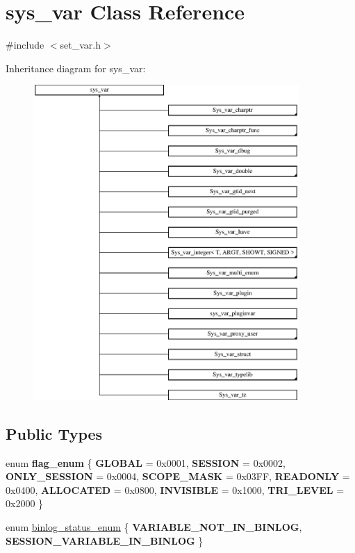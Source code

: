 \hypertarget{classsys__var}{}\section{sys\+\_\+var Class Reference}
\label{classsys__var}


{\ttfamily \#include $<$set\+\_\+var.\+h$>$}

Inheritance diagram for sys\+\_\+var\+:\begin{figure}[H]
\begin{center}
\leavevmode
\includegraphics[height=12.000000cm]{classsys__var}
\end{center}
\end{figure}
\subsection*{Public Types}
\begin{DoxyCompactItemize}
\item 
\mbox{\label{classsys__var_a3ffb3adc1beedff5322c9d39b53cd22a}} 
enum {\bfseries flag\+\_\+enum} \{ \newline
{\bfseries G\+L\+O\+B\+AL} = 0x0001, 
{\bfseries S\+E\+S\+S\+I\+ON} = 0x0002, 
{\bfseries O\+N\+L\+Y\+\_\+\+S\+E\+S\+S\+I\+ON} = 0x0004, 
{\bfseries S\+C\+O\+P\+E\+\_\+\+M\+A\+SK} = 0x03FF, 
\newline
{\bfseries R\+E\+A\+D\+O\+N\+LY} = 0x0400, 
{\bfseries A\+L\+L\+O\+C\+A\+T\+ED} = 0x0800, 
{\bfseries I\+N\+V\+I\+S\+I\+B\+LE} = 0x1000, 
{\bfseries T\+R\+I\+\_\+\+L\+E\+V\+EL} = 0x2000
 \}
\item 
enum \mbox{\hyperlink{classsys__var_a664520ec82191888717c86085bfa83ce}{binlog\+\_\+status\+\_\+enum}} \{ {\bfseries V\+A\+R\+I\+A\+B\+L\+E\+\_\+\+N\+O\+T\+\_\+\+I\+N\+\_\+\+B\+I\+N\+L\+OG}, 
{\bfseries S\+E\+S\+S\+I\+O\+N\+\_\+\+V\+A\+R\+I\+A\+B\+L\+E\+\_\+\+I\+N\+\_\+\+B\+I\+N\+L\+OG}
 \}
\end{DoxyCompactItemize}
